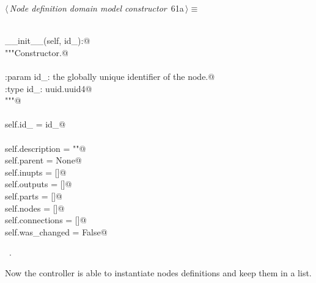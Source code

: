 \documentclass[
    a4paper,      %
    10pt,         %
    openright,    %
    notitlepage,  %
    parskip=half, %
]{scrreprt}       %
\theoremstyle{definition}                    %
\begin{document}
\begin{flushleft} \small
\begin{minipage}{\linewidth}\label{scrap103}\raggedright\small
{} $\langle\,${\itshape Node definition domain model constructor}\nobreak\ {\footnotesize {61a}}$\,\rangle\equiv$
\vspace{-1ex}
\begin{list}{}{} \item
\mbox{}\lstinline@@\\
\mbox{}\lstinline@def __init__(self, id_):@\\
\mbox{}\lstinline@    """Constructor.@\\
\mbox{}\lstinline@@\\
\mbox{}\lstinline@    :param id_: the globally unique identifier of the node.@\\
\mbox{}\lstinline@    :type  id_: uuid.uuid4@\\
\mbox{}\lstinline@    """@\\
\mbox{}\lstinline@@\\
\mbox{}\lstinline@    self.id_   = id_@\\
\mbox{}\lstinline@@\\
\mbox{}\lstinline@    self.description = ""@\\
\mbox{}\lstinline@    self.parent = None@\\
\mbox{}\lstinline@    self.inupts = []@\\
\mbox{}\lstinline@    self.outputs = []@\\
\mbox{}\lstinline@    self.parts = []@\\
\mbox{}\lstinline@    self.nodes = []@\\
\mbox{}\lstinline@    self.connections = []@\\
\mbox{}\lstinline@    self.was_changed = False@{\NWsep}
\end{list}
\vspace{-1.5ex}
\footnotesize
\begin{list}{}{\setlength{\itemsep}{-\parsep}\setlength{\itemindent}{-\leftmargin}}
\item \NWtxtMacroRefIn\ .

\item{}
\end{list}
\end{minipage}\vspace{4ex}
\end{flushleft}
Now the controller is able to instantiate nodes definitions and keep them in a
list.
\end{document}
